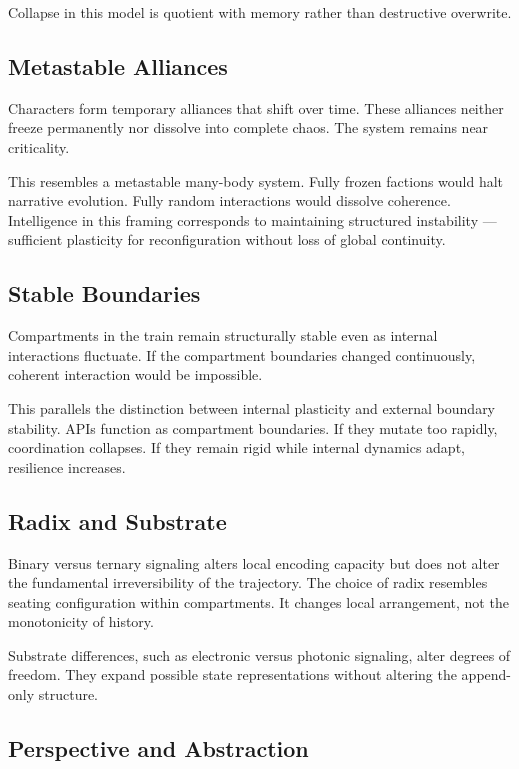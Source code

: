 \documentclass[12pt]{article}
\begin{document}
Collapse in this model is quotient with memory rather than destructive overwrite.

\subsection*{Metastable Alliances}

Characters form temporary alliances that shift over time. These alliances neither freeze permanently nor dissolve into complete chaos. The system remains near criticality.

This resembles a metastable many-body system. Fully frozen factions would halt narrative evolution. Fully random interactions would dissolve coherence. Intelligence in this framing corresponds to maintaining structured instability — sufficient plasticity for reconfiguration without loss of global continuity.

\subsection*{Stable Boundaries}

Compartments in the train remain structurally stable even as internal interactions fluctuate. If the compartment boundaries changed continuously, coherent interaction would be impossible.

This parallels the distinction between internal plasticity and external boundary stability. APIs function as compartment boundaries. If they mutate too rapidly, coordination collapses. If they remain rigid while internal dynamics adapt, resilience increases.

\subsection*{Radix and Substrate}

Binary versus ternary signaling alters local encoding capacity but does not alter the fundamental irreversibility of the trajectory. The choice of radix resembles seating configuration within compartments. It changes local arrangement, not the monotonicity of history.

Substrate differences, such as electronic versus photonic signaling, alter degrees of freedom. They expand possible state representations without altering the append-only structure.

\subsection*{Perspective and Abstraction}
\end{document}
